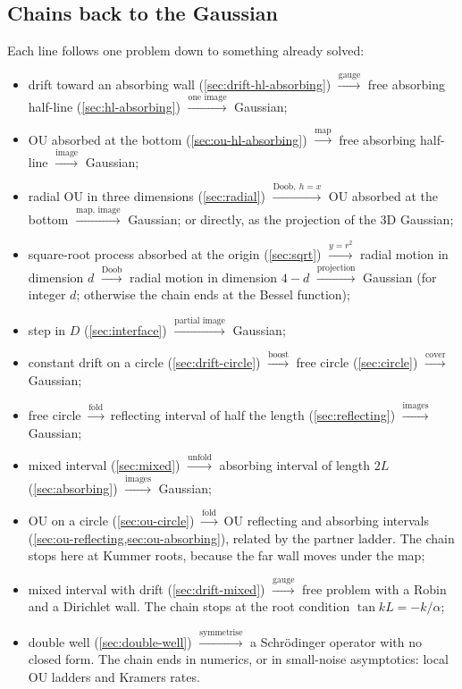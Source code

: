 \documentclass[11pt]{article}
\numberwithin{equation}{section}
\begin{document}
\subsection{Chains back to the Gaussian}

Each line follows one problem down to something already solved:
\begin{itemize}
  \item drift toward an absorbing wall (\cref{sec:drift-hl-absorbing}) $\xrightarrow{\text{gauge}}$ free absorbing
        half-line (\cref{sec:hl-absorbing}) $\xrightarrow{\text{one image}}$ Gaussian;
  \item OU absorbed at the bottom (\cref{sec:ou-hl-absorbing}) $\xrightarrow{\text{map}}$ free absorbing half-line
        $\xrightarrow{\text{image}}$ Gaussian;
  \item radial OU in three dimensions (\cref{sec:radial}) $\xrightarrow{\text{Doob},\ h=x}$ OU absorbed at the
        bottom $\xrightarrow{\text{map, image}}$ Gaussian; or directly, as the projection of the 3D Gaussian;
  \item square-root process absorbed at the origin (\cref{sec:sqrt}) $\xrightarrow{y=r^2}$ radial motion in dimension
        $d$ $\xrightarrow{\text{Doob}}$ radial motion in dimension $4-d$ $\xrightarrow{\text{projection}}$ Gaussian (for
        integer $d$; otherwise the chain ends at the Bessel function);
  \item step in $D$ (\cref{sec:interface}) $\xrightarrow{\text{partial image}}$ Gaussian;
  \item constant drift on a circle (\cref{sec:drift-circle}) $\xrightarrow{\text{boost}}$ free circle
        (\cref{sec:circle}) $\xrightarrow{\text{cover}}$ Gaussian;
  \item free circle $\xrightarrow{\text{fold}}$ reflecting interval of half the length (\cref{sec:reflecting})
        $\xrightarrow{\text{images}}$ Gaussian;
  \item mixed interval (\cref{sec:mixed}) $\xrightarrow{\text{unfold}}$ absorbing interval of length $2L$
        (\cref{sec:absorbing}) $\xrightarrow{\text{images}}$ Gaussian;
  \item OU on a circle (\cref{sec:ou-circle}) $\xrightarrow{\text{fold}}$ OU reflecting and absorbing intervals
        (\cref{sec:ou-reflecting,sec:ou-absorbing}), related by the partner ladder. The chain stops here at Kummer
        roots, because the far wall moves under the map;
  \item mixed interval with drift (\cref{sec:drift-mixed}) $\xrightarrow{\text{gauge}}$ free problem with a Robin and
        a Dirichlet wall. The chain stops at the root condition $\tan kL=-k/\alpha$;
  \item double well (\cref{sec:double-well}) $\xrightarrow{\text{symmetrise}}$ a Schr\"odinger operator with no
        closed form. The chain ends in numerics, or in small-noise asymptotics: local OU ladders and Kramers rates.
\end{itemize}
\end{document}
